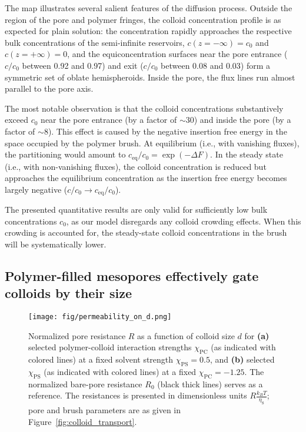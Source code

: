 \documentclass[12pt, a4paper]{article}
\begin{document}
The map illustrates several salient features of the diffusion process.
Outside the region of the pore and polymer fringes, the colloid concentration profile is as expected for plain solution: the concentration rapidly approaches the respective bulk concentrations of the semi-infinite reservoirs, $c(z = -\infty) = c_0$ and $c(z = +\infty) = 0$, and the equiconcentration surfaces near the pore entrance ($c/c_0$ between 0.92 and 0.97) and exit ($c/c_0$ between 0.08 and 0.03) form a symmetric set of oblate hemispheroids.
Inside the pore, the flux lines run almost parallel to the pore axis.

The most notable observation is that the colloid concentrations substantively exceed $c_0$ near the pore entrance (by a factor of $\sim30$) and inside the pore (by a factor  of $\sim8$).
This effect is caused by the negative insertion free energy in the space occupied by the polymer brush.
At equilibrium (i.e., with vanishing fluxes), the partitioning would amount to $c_{\text{eq}}/c_0 = \exp\left( -\Delta F \right)$.
In the steady state (i.e., with non-vanishing fluxes), the colloid concentration is reduced but approaches the equilibrium concentration as the insertion free energy becomes largely negative ($c/c_0 \to c_{\text{eq}}/c_0$).

The presented quantitative results are only valid for sufficiently low bulk concentrations $c_0$, as our model disregards any colloid crowding effects.
When this crowding is accounted for, the steady-state colloid concentrations in the brush will be systematically lower.


\subsection{Polymer-filled mesopores effectively gate colloids by their size}

\begin{figure}
    \centering
    \texttt{[image: fig/permeability\_on\_d.png]}
    \caption{
    Normalized pore resistance $R$ as a function of colloid size $d$ for \textbf{(a)} selected polymer-colloid interaction strengths $\chi_{\text{PC}}$ (as indicated with colored lines) at a fixed solvent strength $\chi_{\text{PS}} =0.5$, and \textbf{(b)} selected $\chi_{\text{PS}}$ (as indicated with colored lines) at a fixed $\chi_{\text{PC}} = -1.25$. 
    The normalized bare-pore resistance $R_{0}$ (black thick lines) serves as a reference.
    The resistances is presented in dimensionless units $R\tfrac{k_{B}T}{\eta_{\text{S}}}$; pore and brush parameters are as given in Figure~\ref{fig:colloid_transport}. 
    }
    \label{fig:R_vs_d}
\end{figure}
\end{document}
